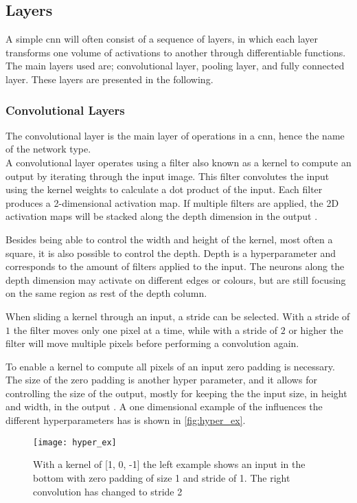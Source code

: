 \subsection{Layers}
A simple \gls{cnn} will often consist of a sequence of layers, in which each layer transforms one volume of activations to another through differentiable functions. The main layers used are; convolutional layer, pooling layer, and fully connected layer. These layers are presented in the following.

\subsubsection{Convolutional Layers}
The convolutional layer is the main layer of operations in a \gls{cnn}, hence the name of the network type.\\

A convolutional layer operates using a filter also known as a kernel to compute an output by iterating through the input image. This filter convolutes the input using the kernel weights to calculate a dot product of the input. Each filter produces a 2-dimensional activation map. If multiple filters are applied, the 2D activation maps will be stacked along the depth dimension in the output .

Besides being able to control the width and height of the kernel, most often a square, it is also possible to control the depth. Depth is a hyperparameter and corresponds to the amount of filters applied to the input. The neurons along the depth dimension may activate on different edges or colours, but are still focusing on the same region as rest of the depth column.

When sliding a kernel through an input, a stride can be selected. With a stride of $1$ the filter moves only one pixel at a time, while with a stride of $2$ or higher the filter will move multiple pixels before performing a convolution again.

To enable a kernel to compute all pixels of an input zero padding is necessary. The size of the zero padding is another hyper parameter, and it allows for controlling the size of the output, mostly for keeping the the input size, in height and width, in the output \citep{Karpathy2016b}. A one dimensional example of the influences the different hyperparameters has is shown in \autoref{fig:hyper_ex}.

\begin{figure}[H]
	\centering
	\texttt{[image: hyper\_ex]}
	\caption{With a kernel of [1, 0, -1] the left example shows an input in the bottom with zero padding of size 1 and stride of 1. The right convolution has changed to stride 2 \citep{Karpathy2016b}}
	\label{fig:hyper_ex}
\end{figure}


